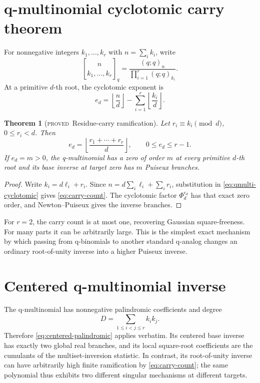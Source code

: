 \documentclass[11pt,letterpaper,oneside,openany]{book}
\newtheorem{theorem}{Theorem}[chapter]
\theoremstyle{definition}
\theoremstyle{remark}
\newcommand{\qmulti}[2]{\genfrac{[}{]}{0pt}{}{#1}{#2}_{q}}
\newcommand{\statusproved}{\textcolor{provedgreen}{\textsc{proved}}}
\begin{document}
\section{q-multinomial cyclotomic carry theorem}
For nonnegative integers \(k_1,\ldots,k_r\) with \(n=\sum_i k_i\), write
\[
 \qmulti{n}{k_1,\ldots,k_r}
 =\frac{(q;q)_n}{\prod_{i=1}^r(q;q)_{k_i}}.
\]
At a primitive \(d\)-th root, the cyclotomic exponent is
\begin{equation}
 e_d=\left\lfloor\frac nd\right\rfloor
 -\sum_{i=1}^r\left\lfloor\frac{k_i}d\right\rfloor.
 \label{eq:qmulti-cyclotomic}
\end{equation}

\begin{theorem}[\statusproved\ Residue-carry ramification]
Let \(r_i\equiv k_i\pmod d\), \(0\le r_i<d\).  Then
\begin{equation}
 e_d=\left\lfloor\frac{r_1+\cdots+r_r}{d}\right\rfloor,
 \qquad 0\le e_d\le r-1.
 \label{eq:carry-count}
\end{equation}
If \(e_d=m>0\), the q-multinomial has a zero of order \(m\) at every primitive
\(d\)-th root and its base inverse at target zero has \(m\) Puiseux branches.
\end{theorem}
\begin{proof}
Write \(k_i=d\ell_i+r_i\).  Since
\(n=d\sum_i\ell_i+\sum_i r_i\), substitution in
\cref{eq:qmulti-cyclotomic} gives \cref{eq:carry-count}.  The cyclotomic factor
\(\Phi_d^{e_d}\) has that exact zero order, and Newton--Puiseux gives the inverse
branches.
\end{proof}

For \(r=2\), the carry count is at most one, recovering Gaussian
square-freeness.  For many parts it can be arbitrarily large.  This is the
simplest exact mechanism by which passing from q-binomials to another standard
q-analog changes an ordinary root-of-unity inverse into a higher Puiseux
inverse.

\section{Centered q-multinomial inverse}
The q-multinomial has nonnegative palindromic coefficients and degree
\[
 D=\sum_{1\le i<j\le r}k_ik_j.
\]
Therefore \cref{eq:centered-palindromic} applies verbatim.  Its centered base
inverse has exactly two global real branches, and its local square-root
coefficients are the cumulants of the multiset-inversion statistic.  In
contrast, its root-of-unity inverse can have arbitrarily high finite
ramification by \cref{eq:carry-count}; the same polynomial thus exhibits two
different singular mechanisms at different targets.
\end{document}
